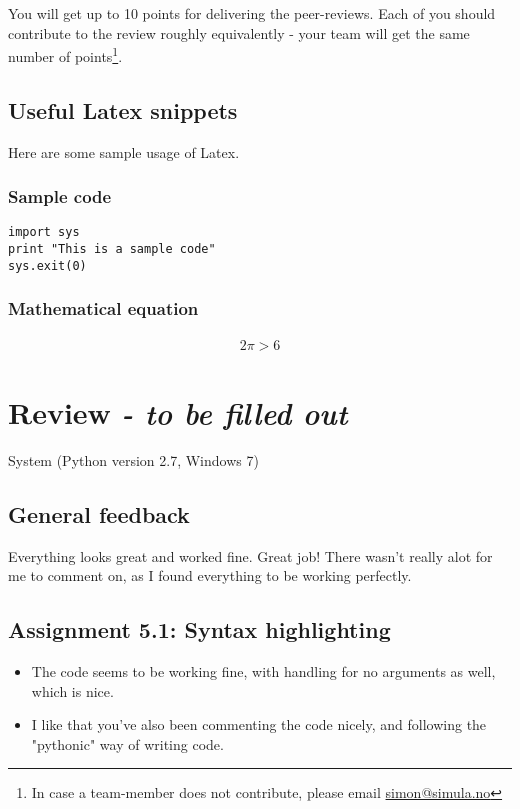 \documentclass[a4paper]{article}
\begin{document}
You will get up to 10 points for delivering the peer-reviews. Each of you should contribute to the review roughly equivalently - your team will get the same number of points\footnote{In case a team-member does not contribute, please email \href{mailto:simon@simula.no}{simon@simula.no}}. 

\subsection{Useful Latex snippets}
Here are some sample usage of Latex.

\subsubsection{Sample code}
\begin{verbatim}
import sys
print "This is a sample code"
sys.exit(0)
\end{verbatim}

\subsubsection{Mathematical equation}
\begin{align}
2 \pi > 6
\end{align}



\section{Review \emph{- to be filled out}}\label{sec:review}

System (Python version 2.7, Windows 7) 

\subsection*{General feedback}
Everything looks great and worked fine. Great job! There wasn't really alot for me to comment on, as I found everything to be working perfectly. 

\subsection*{Assignment 5.1: Syntax highlighting}
\begin{itemize}
\item The code seems to be working fine, with handling for no arguments as well, which is nice. 
\item I like that you've also been commenting the code nicely, and following the "pythonic" way of writing code. 
\end{itemize}
\end{document}
